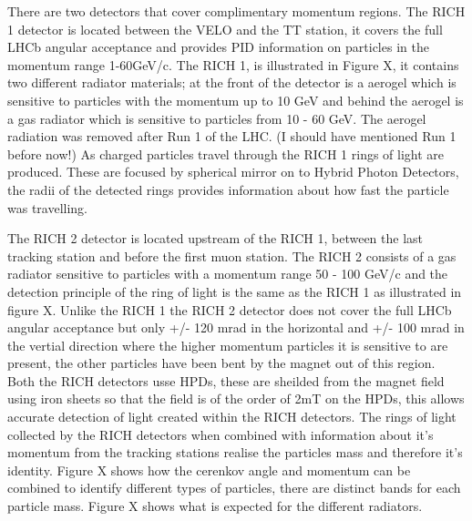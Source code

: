 There are two detectors that cover complimentary momentum regions. The RICH 1 detector is located between the VELO and the TT station, it covers the full LHCb angular acceptance and provides PID information on particles in the momentum range 1-60GeV/c. The RICH 1, is illustrated in Figure X, it contains two different radiator materials; at the front of the detector is a aerogel which is sensitive to particles with the momentum up to 10 GeV and behind the aerogel is a gas radiator which is sensitive to particles from 10 - 60 GeV. The aerogel radiation was removed after Run 1 of the LHC. (I should have mentioned Run 1 before now!) As charged particles travel through the RICH 1 rings of light are produced. These are focused by spherical mirror on to Hybrid Photon Detectors, the radii of the detected rings provides information about how fast the particle was travelling. %

The RICH 2 detector is located upstream of the RICH 1, between the last tracking station and before the first muon station. The RICH 2 consists of a gas radiator sensitive to particles with a momentum range 50 - 100 GeV/c and the detection principle of the ring of light is the same as the RICH 1 as illustrated in figure X. Unlike the RICH 1 the RICH 2 detector does not cover the full LHCb angular acceptance but only +/- 120 mrad in the horizontal and +/- 100 mrad in the vertial direction where the higher momentum particles it is sensitive to are present, the other particles have been bent by the magnet out of this region. 
Both the RICH detectors usse HPDs, these are sheilded from the magnet field using iron sheets so that the field is of the order of 2mT on the HPDs, this allows accurate detection of light created within the RICH detectors. 
The rings of light collected by the RICH detectors when combined with information about it’s momentum from the tracking stations realise the particles mass and therefore it’s identity. Figure X shows how the cerenkov angle and momentum can be combined to identify different types of particles, there are distinct bands for each particle mass. Figure X shows what is expected for the different radiators.  

